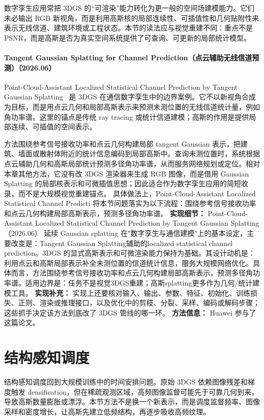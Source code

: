 数字孪生应用常把 3DGS 的“可渲染”能力转化为更一般的空间场建模能力。它们未必输出 RGB 新视角，而是利用高斯核的局部连续性、可插值性和几何贴附性来表示无线信道、建筑环境或工程状态。本节的读法应与视觉重建不同：重点不是 PSNR，而是高斯是否为真实空间系统提供了可查询、可更新的局部统计模型。
\paragraph{Tangent Gaussian Splatting for Channel Prediction（点云辅助无线信道预测）（2026.06）}
Point-Cloud-Assistant Localized Statistical Channel Prediction by Tangent Gaussian Splatting~\cite{2606_18734} 是 3DGS 在通信数字孪生中的边界案例。它不以新视角合成为目标，而是用点云几何和局部高斯表示来预测未测位置的无线信道统计量，例如角功率谱。这里的锚点是传统 ray tracing 或统计信道建模；高斯的作用是提供局部连续、可插值的空间表示。

方法围绕参考信号接收功率和点云几何构建局部 tangent Gaussian 表示，把建筑、墙面或散射体附近的统计信息编码到局部高斯中。查询未测位置时，系统根据点云辅助几何和高斯局部统计预测多径角功率谱，从而服务网络规划或定位。相对本章其他方法，它没有改 3DGS 渲染器来生成 RGB 图像，而是借用 Gaussian Splatting 的局部核表示和可微插值思想；因此适合作为数字孪生应用的简短收录，而不是大规模视觉重建锚点。
具体做法上，Point-Cloud-Assistant Localized Statistical Channel Predicti 将本节问题落实为以下流程：围绕参考信号接收功率和点云几何构建局部高斯表示，预测多径角功率谱。
\textbf{实现细节：} Point-Cloud-Assistant Localized Statistical Channel Prediction by Tangent Gaussian Splatting（2026.06） 延续 Gaussian splatting 在"数字孪生与通信建模"上的基本设定，主要改变是：Tangent Gaussian Splatting辅助的localized statistical channel prediction。3DGS 的显式高斯表示和可微渲染能力保持为基础。其设计动机是：利用点云和高斯局部表示补全未测位置的信道统计信息，服务大规模网络优化。具体而言，方法围绕参考信号接收功率和点云几何构建局部高斯表示，预测多径角功率谱。适用边界是：任务不是视觉3DGS重建；高斯splatting更多作为几何/统计建模工具。
\textbf{实现补充：} 实现上还要核对输入、输出、参数、特征、初始化、训练损失、正则、渲染或推理接口，以及优化中的剪枝、分裂、采样、编码或解码步骤；这些抓手决定该方法到底改了 3DGS 管线的哪一环。
\textbf{方法信息：} Huawei 参与了这篇论文。
\section{结构感知调度}

结构感知调度回到大规模训练中的时间安排问题。原始 3DGS 依赖图像残差和梯度触发 densification，但在稀疏观测区域，高频图像监督可能先于可靠几何到来，导致高斯数量膨胀或漂浮。本节方法不是换一个新表示，而是调度监督频率、图像采样和密度增长，让高斯先建立低频结构，再逐步吸收高频纹理。



